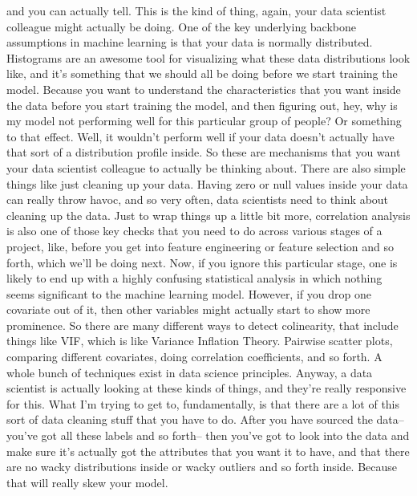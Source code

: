     and you can actually tell.
    This is the kind of thing, again, your data scientist colleague
    might actually be doing.
    One of the key underlying backbone assumptions in machine learning
    is that your data is normally distributed.
    Histograms are an awesome tool for visualizing what these data
    distributions look like, and it's something
    that we should all be doing before we start training the model.
    Because you want to understand the characteristics that you
    want inside the data before you start training the model,
    and then figuring out, hey, why is my model not performing well
    for this particular group of people?
    Or something to that effect.
    Well, it wouldn't perform well if your data doesn't actually
    have that sort of a distribution profile inside.
    So these are mechanisms that you want your data scientist colleague
    to actually be thinking about.
    There are also simple things like just cleaning up your data.
    Having zero or null values inside your data can really throw havoc,
    and so very often, data scientists need to think about cleaning up the data.
    Just to wrap things up a little bit more,
    correlation analysis is also one of those key checks
    that you need to do across various stages of a project,
    like, before you get into feature engineering
    or feature selection and so forth, which we'll be doing next.
    Now, if you ignore this particular stage,
    one is likely to end up with a highly confusing statistical analysis
    in which nothing seems significant to the machine learning model.
    However, if you drop one covariate out of it,
    then other variables might actually start to show more prominence.
    So there are many different ways to detect
    colinearity, that include things like VIF, which
    is like Variance Inflation Theory.
    Pairwise scatter plots, comparing different covariates,
    doing correlation coefficients, and so forth.
    A whole bunch of techniques exist in data science principles.
    Anyway, a data scientist is actually looking at these kinds of things,
    and they're really responsive for this.
    What I'm trying to get to, fundamentally,
    is that there are a lot of this sort of data cleaning stuff
    that you have to do.
    After you have sourced the data-- you've got all these labels
    and so forth-- then you've got to look into the data
    and make sure it's actually got the attributes that you want it to have,
    and that there are no wacky distributions inside or wacky outliers
    and so forth inside.
    Because that will really skew your model.
